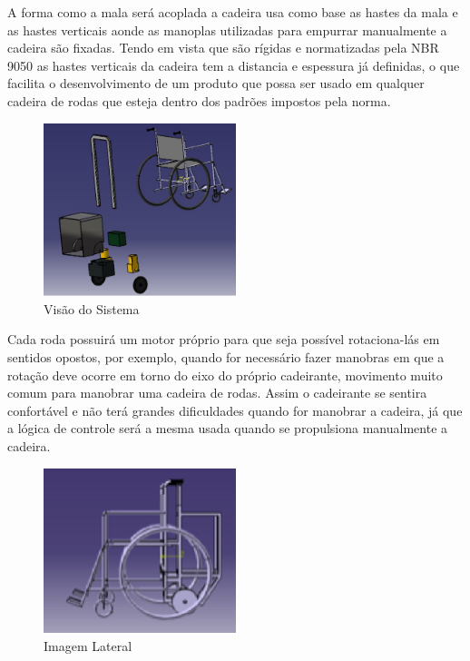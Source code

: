 A forma como a mala será acoplada a cadeira usa como base as hastes da mala e as hastes verticais aonde as manoplas utilizadas para empurrar manualmente a cadeira são fixadas. Tendo em vista que são rígidas e normatizadas pela NBR 9050 as hastes verticais da cadeira tem a distancia e espessura já definidas, o que facilita o desenvolvimento de um produto que possa ser usado em qualquer cadeira de rodas que esteja dentro dos padrões impostos pela norma.

\begin{figure}[!htb]
\centering
\includegraphics[width=0.5\textwidth]{figuras/estrutura/explode}
\caption{Visão do Sistema}
\label{fig:sistema}
\end{figure}

Cada roda possuirá um motor próprio para que seja possível rotaciona-lás em sentidos opostos, por exemplo, quando for necessário fazer manobras em que a rotação deve ocorre em torno do eixo do próprio cadeirante, movimento muito comum para manobrar uma cadeira de rodas. Assim o cadeirante se sentira confortável e não terá grandes dificuldades quando for manobrar a cadeira, já que a lógica de controle será a mesma usada quando se propulsiona manualmente a cadeira.

\begin{figure}[!htb]
\centering
\includegraphics[width=0.5\textwidth]{figuras/estrutura/vista_lateral_cadeira}
\caption{Imagem Lateral}
\label{fig:lateral}
\end{figure}

